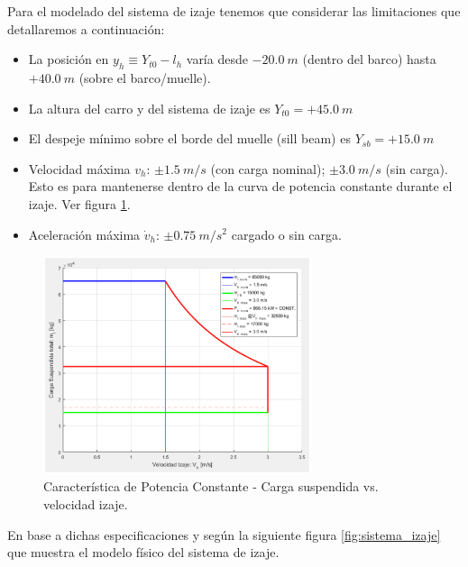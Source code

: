 \documentclass[11pt]{article}
\begin{document}
Para el modelado del sistema de izaje tenemos que considerar las limitaciones que detallaremos a continuación:
\begin{itemize}
	\item La posición en $y_{h}\equiv Y_{t0}-l_{h}$ varía desde $-20.0\ m$ (dentro del barco) hasta $+40.0\ m$ (sobre el barco/muelle).
	\item La altura del carro y del sistema de izaje es $Y_{t0}= +45.0\ m$
	\item El despeje mínimo sobre el borde del muelle (sill beam) es $Y_{sb}= +15.0\ m$
	\item Velocidad máxima $v_{h}$: $\pm 1.5\ m/s$ (con carga nominal); $\pm 3.0\ m/s$ (sin carga). Esto es para mantenerse dentro de la curva de potencia constante durante el izaje. Ver figura \ref{fig:curva_potencia_motor}.
	\item Aceleración máxima $\dot{v}_{h}$: $\pm 0.75\ m/s^{2}$ cargado o sin carga.
\end{itemize}

\begin{figure}[h!]
	\centering
	\includegraphics[width=0.7\textwidth]{images/imagen_4_curva_pot_cte.png}
	\caption{Característica de Potencia Constante - Carga suspendida vs. velocidad izaje.}
	\label{fig:curva_potencia_motor}
\end{figure}

\newpage

En base a dichas especificaciones y según la siguiente figura \ref{fig:sistema_izaje} que muestra el modelo físico del sistema de izaje.
\end{document}

